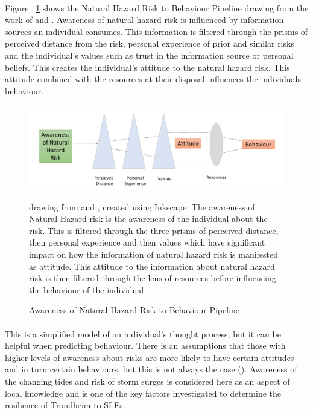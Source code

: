 \paragraph{}
Figure ~\ref{fig:hazard_to_behaviour} shows the Natural Hazard Risk to Behaviour Pipeline drawing from the work of \cite{whitmarsh_are_2008} and \cite{lujala_climate_2015}. Awareness of natural hazard risk is influenced by information sources an individual consumes. This information is filtered through the prisms of perceived distance from the risk, personal experience of prior and similar risks and the individual's values such as trust in the information source or personal beliefs. This creates the individual's attitude to the natural hazard risk. This attitude combined with the resources at their disposal influences the individuals behaviour.

\paragraph{}


\begin{figure}[h]
    \centering
    \includegraphics[width=1\textwidth]{fig_theory/new_awareness_ lujala_whitmarsh.png}
     \caption{Awareness of Natural Hazard Risk to Behaviour Pipeline}{ drawing from \cite{lujala_climate_2015} and \cite{whitmarsh_are_2008}, created using Inkscape.  The awareness of Natural Hazard risk is the awareness of the individual about the risk. This is filtered through the three prisms of perceived distance, then personal experience and then values which have significant impact on how the information of natural hazard risk is manifested as attitude.  
    This attitude to the information about natural hazard risk is then filtered through the lens of resources before influencing the behaviour of the individual.} 
    \label{fig:hazard_to_behaviour}
\end{figure} 
\paragraph{}
This is a simplified model of an individual's thought process, but it can be helpful when predicting behaviour. There is an assumptions that those with higher levels of awareness about risks are more likely to have certain attitudes and in turn certain behaviours, but this is not always the case (\cite{lujala_climate_2015}).  Awareness of the changing tides and risk of storm surges is considered here as an aspect of local knowledge and is one of the key factors investigated to determine the resilience of Trondheim to SLEs. 

